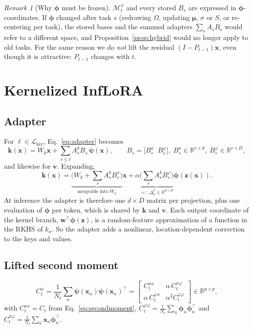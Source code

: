 \documentclass[11pt]{article}
\theoremstyle{plain}
\theoremstyle{definition}
\theoremstyle{remark}
\newtheorem{remark}{Remark}
\newcommand{\R}{\mathbb{R}}
\newcommand{\M}{\mathcal{M}}
\newcommand{\Lk}{\mathcal{L}_{\mathrm{ker}}}
\newcommand{\x}{\bm{x}}
\newcommand{\z}{\bm{z}}
\newcommand{\vphi}{\bm{\phi}}
\newcommand{\vpsi}{\bm{\psi}}
\newcommand{\vmu}{\bm{\mu}}
\begin{document}
\begin{remark}[Why $\vphi$ must be frozen]
$\M^{\varphi}_t$ and every stored $B_s$ are expressed in $\vphi$-coordinates. If $\vphi$ changed after task $s$ (redrawing $\Omega$, updating $\vmu$, $\sigma$ or $S$, or re-centering per task), the stored bases and the summed adapters $\sum_sA_sB_s$ would refer to a different space, and Proposition~\ref{prop:hybrid} would no longer apply to old tasks. For the same reason we do \emph{not} lift the residual $(I-P_{t-1})\x$, even though it is attractive: $P_{t-1}$ changes with $t$.
\end{remark}

\section{Kernelized InfLoRA}\label{sec:method}

\subsection{Adapter}
For $\ell\in\Lk$, Eq.~\eqref{eq:adapter} becomes
\begin{equation}\label{eq:kadapter}
\bm k(\x)=W_k\x+\sum_{s\le t}A^k_sB_s\,\vpsi(\x),\qquad B_s=\big[B_s^{x}\;\;B_s^{\varphi}\big],\; B_s^{x}\in\R^{r\times d},\;B_s^{\varphi}\in\R^{r\times D},
\end{equation}
and likewise for $\bm v$. Expanding,
\begin{equation}\label{eq:merge}
\bm k(\x)=\underbrace{\Big(W_k+\sum_sA^k_sB^x_s\Big)}_{\text{mergeable into }W_k}\x
+\alpha\underbrace{\Big(\sum_sA^k_sB^\varphi_s\Big)}_{=:\,\Delta^{\varphi}_k\in\R^{d\times D}}\vphi(\z(\x)).
\end{equation}
At inference the adapter is therefore one $d\times D$ matrix per projection, plus one evaluation of $\vphi$ per token, which is shared by $\bm k$ and $\bm v$. Each output coordinate of the kernel branch, $\bm w^{\top}\vphi(\z)$, is a random-feature approximation of a function in the RKHS of $k_\sigma$. So the adapter adds a nonlinear, location-dependent correction to the keys and values.

\subsection{Lifted second moment}
\begin{equation}\label{eq:Cpsi}
C^{\psi}_t=\frac1{N_t}\sum_n\vpsi(\x_n)\vpsi(\x_n)^{\top}=
\begin{bmatrix}C^{xx}_t & \alpha\,C^{x\varphi}_t\\ \alpha\,C^{\varphi x}_t & \alpha^2 C^{\varphi\varphi}_t\end{bmatrix}\in\R^{p\times p},
\end{equation}
with $C^{xx}_t=C_t$ from Eq.~\eqref{eq:secondmoment}, $C^{\varphi\varphi}_t=\frac1{N_t}\sum_n\vphi_n\vphi_n^{\top}$ and $C^{x\varphi}_t=\frac1{N_t}\sum_n\x_n\vphi_n^{\top}$.
\end{document}
